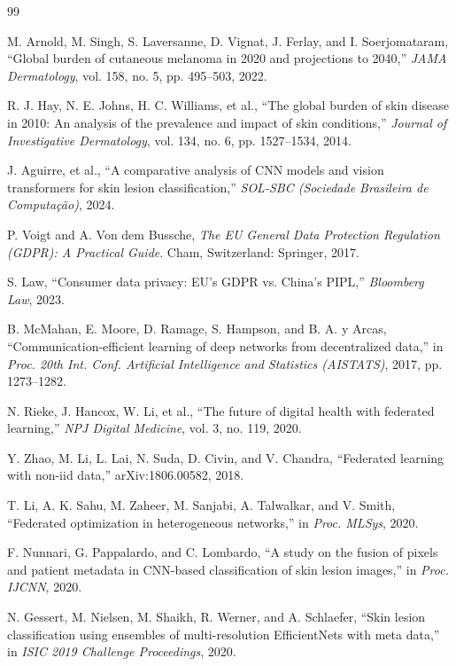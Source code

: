 \documentclass{ieeeaccess}
\begin{document}
\begin{thebibliography}{99}

M. Arnold, M. Singh, S. Laversanne, D. Vignat, J. Ferlay, and I. Soerjomataram,
“Global burden of cutaneous melanoma in 2020 and projections to 2040,”
\emph{JAMA Dermatology}, vol. 158, no. 5, pp. 495–503, 2022.

R. J. Hay, N. E. Johns, H. C. Williams, et al.,
“The global burden of skin disease in 2010: An analysis of the prevalence and impact of skin conditions,”
\emph{Journal of Investigative Dermatology}, vol. 134, no. 6, pp. 1527–1534, 2014.

J. Aguirre, et al.,
“A comparative analysis of CNN models and vision transformers for skin lesion classification,”
\emph{SOL-SBC (Sociedade Brasileira de Computação)}, 2024.

P. Voigt and A. Von dem Bussche,
\emph{The EU General Data Protection Regulation (GDPR): A Practical Guide}.
Cham, Switzerland: Springer, 2017.

S. Law,
“Consumer data privacy: EU’s GDPR vs. China’s PIPL,”
\emph{Bloomberg Law}, 2023.

B. McMahan, E. Moore, D. Ramage, S. Hampson, and B. A. y Arcas,
“Communication-efficient learning of deep networks from decentralized data,”
in \emph{Proc. 20th Int. Conf. Artificial Intelligence and Statistics (AISTATS)}, 2017, pp. 1273–1282.

N. Rieke, J. Hancox, W. Li, et al.,
“The future of digital health with federated learning,”
\emph{NPJ Digital Medicine}, vol. 3, no. 119, 2020.

Y. Zhao, M. Li, L. Lai, N. Suda, D. Civin, and V. Chandra,
“Federated learning with non-iid data,”
arXiv:1806.00582, 2018.

T. Li, A. K. Sahu, M. Zaheer, M. Sanjabi, A. Talwalkar, and V. Smith,
“Federated optimization in heterogeneous networks,”
in \emph{Proc. MLSys}, 2020.

F. Nunnari, G. Pappalardo, and C. Lombardo,
“A study on the fusion of pixels and patient metadata in CNN-based classification of skin lesion images,”
in \emph{Proc. IJCNN}, 2020.

N. Gessert, M. Nielsen, M. Shaikh, R. Werner, and A. Schlaefer,
“Skin lesion classification using ensembles of multi-resolution EfficientNets with meta data,”
in \emph{ISIC 2019 Challenge Proceedings}, 2020.


\end{thebibliography}
\end{document}
